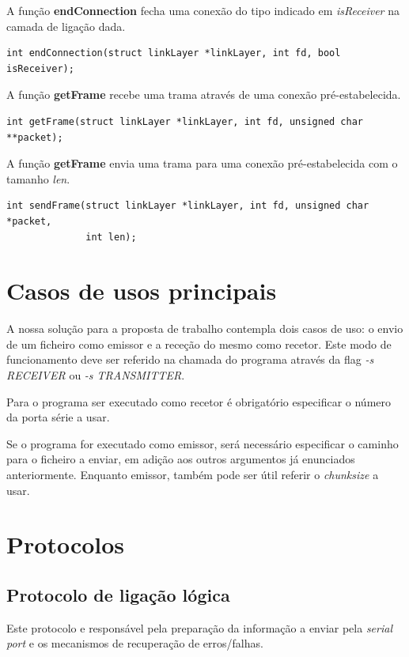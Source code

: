 \documentclass[11pt]{report}
\begin{document}
A função \textbf{endConnection} fecha uma conexão do tipo indicado em \textit{isReceiver}
na camada de ligação dada.
\begin{lstlisting}
int endConnection(struct linkLayer *linkLayer, int fd, bool isReceiver);
\end{lstlisting}

A função \textbf{getFrame} recebe uma trama através de uma conexão pré-estabelecida.
\begin{lstlisting}
int getFrame(struct linkLayer *linkLayer, int fd, unsigned char **packet);
\end{lstlisting}

A função \textbf{getFrame} envia uma trama para uma conexão pré-estabelecida com o tamanho
\textit{len}.
\begin{lstlisting}
int sendFrame(struct linkLayer *linkLayer, int fd, unsigned char *packet,
              int len);
\end{lstlisting}

{\let\clearpage\relax \chapter{Casos de usos principais}}

A nossa solução para a proposta de trabalho contempla dois casos de uso: o envio de um ficheiro
como emissor e a receção do mesmo como recetor. Este modo de funcionamento deve ser referido
na chamada do programa através da flag \textit{-s RECEIVER} ou \textit{-s TRANSMITTER}.

Para o programa ser executado como recetor é obrigatório especificar o número da porta série a usar.



Se o programa for executado como emissor, será necessário especificar o caminho para o ficheiro a enviar,
em adição aos outros argumentos já enunciados anteriormente. Enquanto emissor, também pode ser útil referir
o \textit{chunksize} a usar.

\chapter{Protocolos}

\section{Protocolo de ligação lógica}

Este protocolo e responsável pela preparação da informação a enviar pela
\textit{serial port} e os mecanismos de recuperação de erros/falhas.
\end{document}
